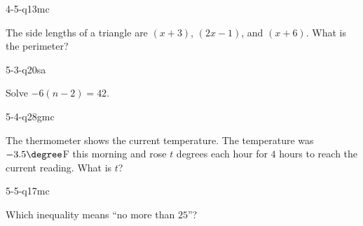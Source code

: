\begin{practiceQuestion}{4-5-q13}{mc}
\begin{questionText}
The side lengths of a triangle are $(x + 3)$, $(2x - 1)$, and $(x + 6)$. What is the perimeter?
\end{questionText}
\end{practiceQuestion}

\begin{practiceQuestion}{5-3-q20}{sa}
\begin{questionText}
Solve $-6(n - 2) = 42$.
\end{questionText}
\end{practiceQuestion}

\begin{practiceQuestion}{5-4-q28}{gmc}
\begin{questionText}
The thermometer shows the current temperature. The temperature was $-3.5\degree$F this morning and rose $t$ degrees each hour for $4$ hours to reach the current reading. What is $t$?

\begin{center}
\end{center}
\end{questionText}
\end{practiceQuestion}

\begin{practiceQuestion}{5-5-q17}{mc}
\begin{questionText}
Which inequality means ``no more than $25$''?
\end{questionText}
\end{practiceQuestion}

